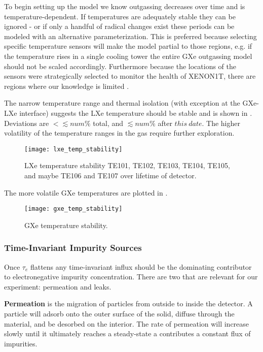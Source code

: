 To begin setting up the model we know outgassing decreases over time and is temperature-dependent.  If temperatures
are adequately stable they can be ignored - or if only a handful of radical changes exist these periods can be modeled with an
alternative parameterization.  This is preferred because selecting specific temperature sensors will make the model
partial to those regions, e.g. if the temperature rises in a single cooling tower the entire GXe outgassing model should not be scaled
accordingly.  Furthermore because the locations of the sensors were strategically selected to monitor the health of XENON1T, there are
regions where our knowledge is limited .

The narrow temperature range and thermal isolation (with exception at the GXe-LXe interface)
suggests the LXe temperature should be stable and is shown in .  Deviations are
$< \lesssim num\%$ total, and $\lesssim num\%$ after $this\ date$.  The higher volatility of the temperature ranges in the gas require
further exploration.

\begin{figure}
\centering
\texttt{[image: lxe\_temp\_stability]}
\caption{LXe temperature stability TE101, TE102, TE103, TE104, TE105, and maybe TE106 and TE107 over lifetime of detector.}
\label{fig:electron_lifetime_model_outgassing_lxe_temp}
\end{figure}

The more volatile GXe temperatures are plotted in .

\begin{figure}
\centering
\texttt{[image: gxe\_temp\_stability]}
\caption{GXe temperature stability.}
\label{fig:electron_lifetime_model_outgassing_gxe_temp}
\end{figure}



\subsubsection{Time-Invariant Impurity Sources}
\label{subsubsec:electron_lifetime_model_outgassing_leak_sources}
Once $\tau_e$ flattens any time-invariant influx should be the dominating contributor to electronegative impurity concentration.  There
are two that are relevant for our experiment: permeation and leaks.

\textbf{Permeation} is the migration of particles from outside to inside the detector.  A particle will adsorb onto the outer surface of
the solid, diffuse through the material, and be desorbed on the interior.  The rate of permeation will increase slowly until it ultimately
reaches a steady-state a contributes a constant flux of impurities.

